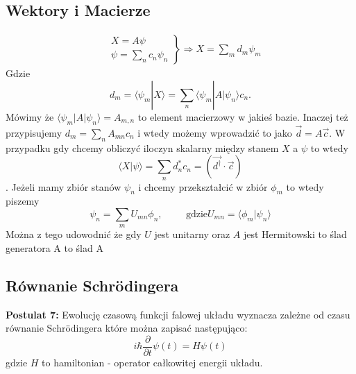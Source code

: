 \subsection{Wektory i Macierze}
\begin{align*}
	&\left.
	\begin{aligned}
		X = A \psi \\
		\psi = \sum_n c_n \psi_n
	\end{aligned}
	\right\}
	\Rightarrow X = \sum_m d_m \psi_m
\end{align*}
Gdzie $$d_m = \langle \psi_m | X \rangle = \sum_n \langle \psi_m | A | \psi_n \rangle c_n.$$ Mówimy że $\langle \psi_m | A | \psi_n \rangle = A_{m,n}$ to element macierzowy w jakieś bazie. Inaczej też przypisujemy $ d_m = \sum_n A_{mn}c_n $ i wtedy możemy wprowadzić to jako $\overrightarrow{d} = A \overrightarrow{c}$. W przypadku gdy chcemy obliczyć iloczyn skalarny między stanem $X$ a $\psi$ to wtedy $$ \langle X | \psi \rangle = \sum_n d_n^* c_n = (\overrightarrow{d^{\dagger}} \cdot \overrightarrow{c})$$. 
Jeżeli mamy zbiór stanów ${\psi_n}$ i chcemy przekształcić w zbiór ${\phi_m}$ to wtedy piszemy
\begin{equation*}
	\psi_n = \sum_m U_{mn}\phi_n, \hspace{1cm} \text{gdzie} U_{mn} = \langle \phi_m | \psi_n \rangle
\end{equation*}
Można z tego udowodnić że gdy $U$ jest unitarny oraz $A$ jest Hermitowski to ślad generatora A to ślad A
\subsection{Równanie Schrödingera}
\textbf{Postulat 7:} Ewolucję czasową funkcji falowej układu wyznacza zależne od czasu równanie Schrödingera które można zapisać następująco:
\begin{equation*}
	i \hbar \frac{\partial}{\partial t} \psi(t)=H \psi(t)
\end{equation*}
gdzie $H$ to hamiltonian - operator całkowitej energii układu.

